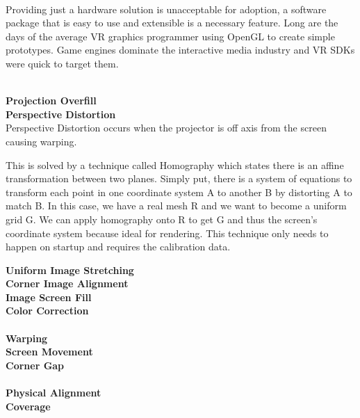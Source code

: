 \label{chapter:softwareChapter}

\label{sec:swIntroductionSection}\\

Providing just a hardware solution is unacceptable for adoption, a software package that is easy to use and extensible is a necessary feature. Long are the days of the average VR graphics programmer using OpenGL to create simple prototypes. Game engines dominate the interactive media industry and VR SDKs were quick to target them.

\label{sec:Software}\\

\filbreak
\noindent\textbf{Projection Overfill} \\

\filbreak
\noindent\textbf{Perspective Distortion} \\
Perspective Distortion occurs when the projector is off axis from the screen causing warping.

This is solved by a technique called Homography which states there is an affine transformation between two planes. Simply put, there is a system of equations to transform each point in one coordinate system A to another B by distorting A to match B. In this case, we have a real mesh R and we want to become a uniform grid G. We can apply homography onto R to get G and thus the screen's coordinate system because ideal for rendering. This technique only needs to happen on startup and requires the calibration data.


\filbreak
\noindent\textbf{Uniform Image Stretching} \\

\filbreak
\noindent\textbf{Corner Image Alignment} \\

\filbreak
\noindent\textbf{Image Screen Fill} \\

\filbreak
\noindent\textbf{Color Correction} \\




\label{sec:Hardware}\\

\filbreak
\noindent\textbf{Warping} \\

\filbreak
\noindent\textbf{Screen Movement} \\

\filbreak
\noindent\textbf{Corner Gap} \\









\label{sec:Tracking}\\

\filbreak
\noindent\textbf{Physical Alignment} \\


\filbreak
\noindent\textbf{Coverage} \\



\clearpage
